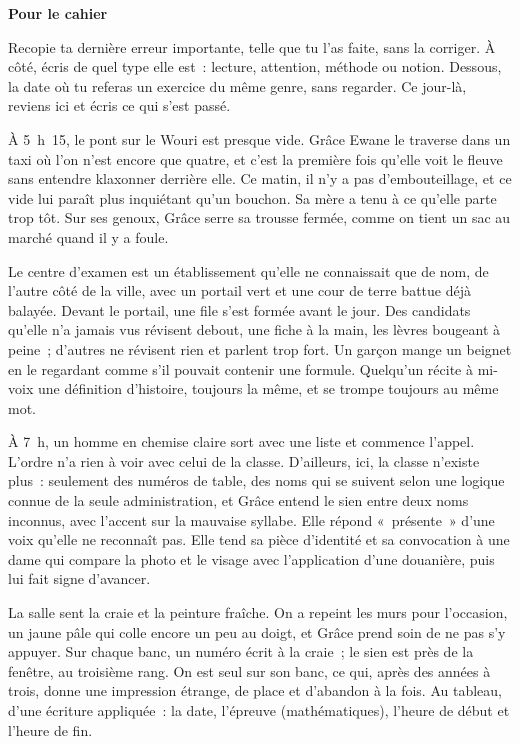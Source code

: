 \documentclass[10.5pt,twoside,openright]{book}
\newenvironment{pourcahier}[1]{\par\vspace{0.9em}\begin{tcolorbox}[colback=black!4,colframe=accent,boxrule=0pt,leftrule=2.2pt,arc=0pt,left=8pt,right=8pt,top=5pt,bottom=5pt]\small\textbf{#1}\par\smallskip}{\end{tcolorbox}\par}
\newcommand{\chapitre}[2]{\cleardoublepage\markright{#2}\thispagestyle{plain}\vspace*{2.2cm}{\noindent\color{accent}\fontsize{54}{54}\selectfont\bfseries #1}\par\vspace{0.5em}{\noindent\LARGE\bfseries #2\par}\vspace{1.6em}\noindent\ignorespaces}
\begin{document}
\begin{pourcahier}{Pour le cahier}
Recopie ta dernière erreur importante, telle que tu l’as faite, sans la corriger. À côté, écris de quel type elle est : lecture, attention, méthode ou notion. Dessous, la date où tu referas un exercice du même genre, sans regarder. Ce jour-là, reviens ici et écris ce qui s’est passé.
\end{pourcahier}


\chapitre{10}{La copie double}

À 5 h 15, le pont sur le Wouri est presque vide. Grâce Ewane le traverse dans un taxi où l’on n’est encore que quatre, et c’est la première fois qu’elle voit le fleuve sans entendre klaxonner derrière elle. Ce matin, il n’y a pas d’embouteillage, et ce vide lui paraît plus inquiétant qu’un bouchon. Sa mère a tenu à ce qu’elle parte trop tôt. Sur ses genoux, Grâce serre sa trousse fermée, comme on tient un sac au marché quand il y a foule.

Le centre d’examen est un établissement qu’elle ne connaissait que de nom, de l’autre côté de la ville, avec un portail vert et une cour de terre battue déjà balayée. Devant le portail, une file s’est formée avant le jour. Des candidats qu’elle n’a jamais vus révisent debout, une fiche à la main, les lèvres bougeant à peine ; d’autres ne révisent rien et parlent trop fort. Un garçon mange un beignet en le regardant comme s’il pouvait contenir une formule. Quelqu’un récite à mi-voix une définition d’histoire, toujours la même, et se trompe toujours au même mot.

À 7 h, un homme en chemise claire sort avec une liste et commence l’appel. L’ordre n’a rien à voir avec celui de la classe. D’ailleurs, ici, la classe n’existe plus : seulement des numéros de table, des noms qui se suivent selon une logique connue de la seule administration, et Grâce entend le sien entre deux noms inconnus, avec l’accent sur la mauvaise syllabe. Elle répond « présente » d’une voix qu’elle ne reconnaît pas. Elle tend sa pièce d’identité et sa convocation à une dame qui compare la photo et le visage avec l’application d’une douanière, puis lui fait signe d’avancer.

La salle sent la craie et la peinture fraîche. On a repeint les murs pour l’occasion, un jaune pâle qui colle encore un peu au doigt, et Grâce prend soin de ne pas s’y appuyer. Sur chaque banc, un numéro écrit à la craie ; le sien est près de la fenêtre, au troisième rang. On est seul sur son banc, ce qui, après des années à trois, donne une impression étrange, de place et d’abandon à la fois. Au tableau, d’une écriture appliquée : la date, l’épreuve (mathématiques), l’heure de début et l’heure de fin.
\end{document}
